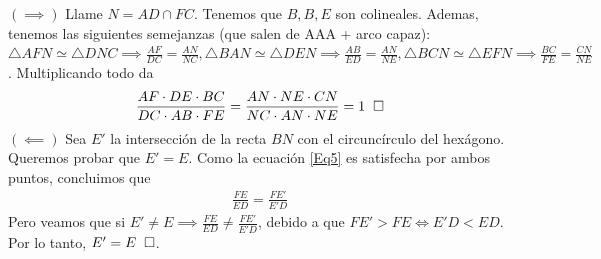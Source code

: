 \begin{sol}
	$(\implies)$ Llame $N = AD \cap FC$. Tenemos que $B, B, E$ son colineales. Ademas, tenemos las siguientes semejanzas (que salen de AAA + arco capaz): $\triangle AFN \simeq \triangle DNC \implies \frac{AF}{DC} = \frac{AN}{NC}, \triangle BAN \simeq \triangle DEN \implies \frac{AB}{ED} = \frac{AN}{NE}, \triangle BCN \simeq \triangle EFN \implies \frac{BC}{FE} = \frac{CN}{NE}$. Multiplicando todo da 
	\begin{align}
    \frac{AF\cdot DE \cdot BC}{DC \cdot AB \cdot FE} = \frac{AN\cdot NE \cdot CN}{NC\cdot AN \cdot NE} = 1 \hspace{0.2cm} \square \label{Eq5}
	\end{align}
	$(\impliedby)$ Sea $E'$ la intersecci\'on de la recta $BN$ con el circunc\'irculo del hex\'agono. Queremos probar que $E' = E$. Como la ecuaci\'on \ref{Eq5} es satisfecha por ambos puntos, concluimos que
	\begin{align}
	\frac{FE}{ED} = \frac{FE'}{E'D}
	\end{align}
	Pero veamos que si $E' \neq E \implies 	\frac{FE}{ED} \neq \frac{FE'}{E'D}$, debido a que $FE' > FE \iff E'D < ED$. Por lo tanto, $E'=E \hspace{0.2cm} \square$.
\end{sol}

